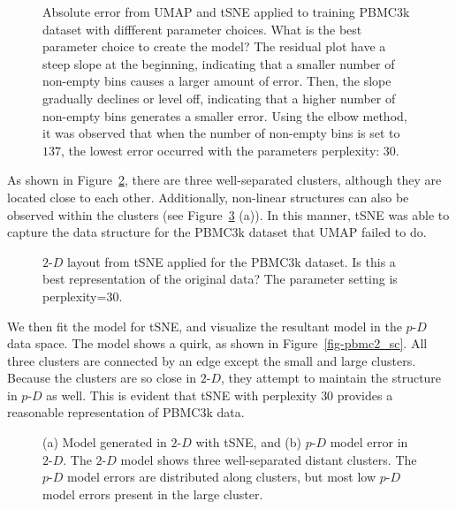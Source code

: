 \documentclass[
  12pt]{article}
\newcommand\pD{$p\text{-}D$}
\newcommand\gD{$2\text{-}D$}
\begin{document}
\begin{figure}[H]


\caption{\label{fig-pbmc-abserror}Absolute error from UMAP and tSNE
applied to training PBMC3k dataset with diffferent parameter choices.
What is the best parameter choice to create the model? The residual plot
have a steep slope at the beginning, indicating that a smaller number of
non-empty bins causes a larger amount of error. Then, the slope
gradually declines or level off, indicating that a higher number of
non-empty bins generates a smaller error. Using the elbow method, it was
observed that when the number of non-empty bins is set to \(137\), the
lowest error occurred with the parameters perplexity: \(30\).}

\end{figure}%

As shown in Figure~\ref{fig-tsne-suggest}, there are three
well-separated clusters, although they are located close to each other.
Additionally, non-linear structures can also be observed within the
clusters (see Figure~\ref{fig-model-pbmc} (a)). In this manner, tSNE was
able to capture the data structure for the PBMC3k dataset that UMAP
failed to do.

\begin{figure}[H]


\caption{\label{fig-tsne-suggest}\(2\text{-}D\) layout from tSNE applied
for the PBMC3k dataset. Is this a best representation of the original
data? The parameter setting is perplexity=30.}

\end{figure}%

We then fit the model for tSNE, and visualize the resultant model in the
\pD{} data space. The model shows a quirk, as shown in
Figure~\ref{fig-pbmc2_sc}. All three clusters are connected by an edge
except the small and large clusters. Because the clusters are so close
in \gD{}, they attempt to maintain the structure in \pD{} as well. This
is evident that tSNE with perplexity \(30\) provides a reasonable
representation of PBMC3k data.

\begin{figure}[H]


\caption{\label{fig-model-pbmc}(a) Model generated in \(2\text{-}D\)
with tSNE, and (b) \(p\text{-}D\) model error in \(2\text{-}D\). The
\(2\text{-}D\) model shows three well-separated distant clusters. The
\(p\text{-}D\) model errors are distributed along clusters, but most low
\(p\text{-}D\) model errors present in the large cluster.}

\end{figure}%
\end{document}
